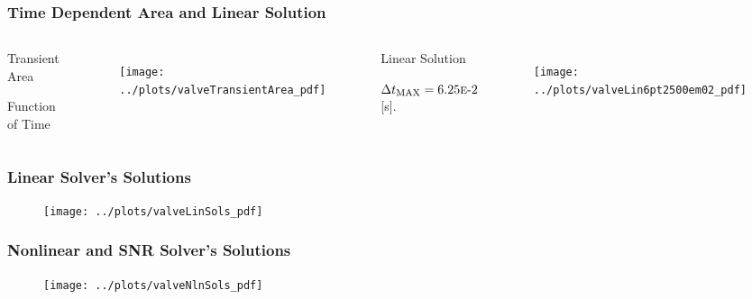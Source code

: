 \documentclass[compress,xcolor=table]{beamer}
\newlength{\hpw}
\begin{document}
\begin{frame}
\frametitle{Time Dependent Area and Linear Solution}

\begin{columns}

\column{\hpw}
\begin{center}
Transient Area

Function of Time
\end{center}
\begin{figure}[h!t]
\centering
\texttt{[image: ../plots/valveTransientArea\_pdf]}
\end{figure}

\column{\hpw}
\begin{center}
Linear Solution

$\dtmax{}=\expneg{6.25}{2}$ [s].
\end{center}
\begin{figure}[h!t]
\centering
\texttt{[image: ../plots/valveLin6pt2500em02\_pdf]}
\end{figure}


\end{columns}


\end{frame}
\begin{frame}
\frametitle{Linear Solver's Solutions}

\begin{figure}[h!t]
\centering
\texttt{[image: ../plots/valveLinSols\_pdf]}
\end{figure}


\end{frame}
\begin{frame}
\frametitle{Nonlinear and SNR Solver's Solutions}

\begin{figure}[h!t]
\centering
\texttt{[image: ../plots/valveNlnSols\_pdf]}
\end{figure}



\end{frame}
\end{document}
